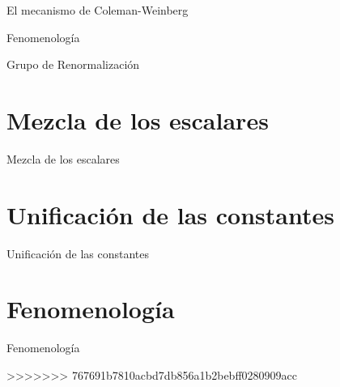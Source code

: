 \documentclass{beamer}
\begin{document}
\begin{frame}{El mecanismo de Coleman-Weinberg}
\begin{frame}{Fenomenología}
\begin{frame}[t]{Grupo de Renormalización}
\end{frame}

\section{Mezcla de los escalares}
\begin{frame}[t]{Mezcla de los escalares}

\end{frame}

\section{Unificación de las constantes}
\begin{frame}[t]{Unificación de las constantes}

\end{frame}

\section{Fenomenología}
\begin{frame}[t]{Fenomenología}

>>>>>>> 767691b7810acbd7db856a1b2bebff0280909acc
\end{frame}


\end{frame}
\end{frame}
\end{document}
